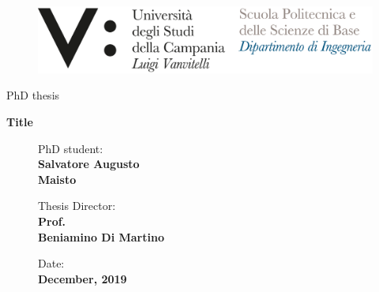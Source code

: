 \begin{titlepage}

\begin{figure}[t]
    \vspace*{-2cm}
    \advance\leftskip-1cm
    \includegraphics[width=1\textwidth]{figures/logo}
\end{figure}

\par
\vspace*{5cm}
\hspace*{\fill} {\Large PhD thesis}
\par
\vspace*{1cm}
\hspace*{\fill} {\LARGE \bf Title}

\begin{figure}[b]
    \advance\leftskip-1cm
    \begin{minipage}{0.4\textwidth}
        PhD student:\\
        {\bf Salvatore Augusto\\Maisto }
    \end{minipage}
    \hfill
    \begin{minipage}{0.4\textwidth}
        Thesis Director:\\
        {\bf Prof.\\Beniamino Di Martino }
    \end{minipage}
    \hfill
    \begin{minipage}{0.2\textwidth}
        Date:\\
        {\bf December, 2019 }
    \end{minipage}
\end{figure}

\end{titlepage}